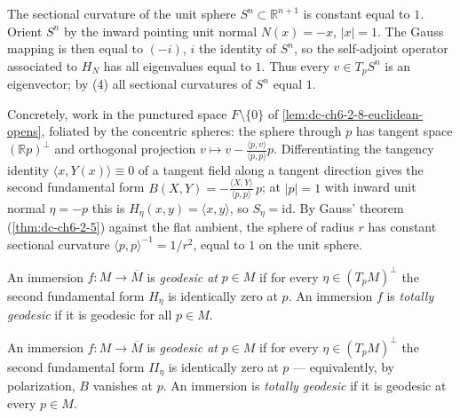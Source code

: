 \begin{example}[curvature of $S^n$]
  \label{ex:dc-ch6-2-8}
  \leanok
  \sketch
  The sectional curvature of the unit sphere $S^n\subset\mathbb{R}^{n+1}$ is constant
  equal to $1$. Orient $S^n$ by the inward pointing unit normal $N(x)=-x$,
  $|x|=1$. The Gauss mapping is then equal to $(-i)$, $i$ the identity of $S^n$, so
  the self-adjoint operator associated to $H_N$ has all eigenvalues equal to $1$.
  Thus every $v\in T_pS^n$ is an eigenvector; by (4) all sectional curvatures of
  $S^n$ equal $1$.

  Concretely, work in the punctured space $F\setminus\{0\}$ of
  \cref{lem:dc-ch6-2-8-euclidean-opens}, foliated by the concentric spheres:
  the sphere through $p$ has tangent space $(\mathbb{R}p)^\perp$ and
  orthogonal projection $v\mapsto v-\frac{\langle p,v\rangle}{\langle
  p,p\rangle}p$. Differentiating the tangency identity $\langle x,
  Y(x)\rangle\equiv0$ of a tangent field along a tangent direction gives the
  second fundamental form $B(X,Y)=-\frac{\langle X,Y\rangle}{\langle
  p,p\rangle}\,p$; at $|p|=1$ with inward unit normal $\eta=-p$ this is
  $H_\eta(x,y)=\langle x,y\rangle$, so $S_\eta=\mathrm{id}$. By Gauss'
  theorem (\cref{thm:dc-ch6-2-5}) against the flat ambient, the sphere of
  radius $r$ has constant sectional curvature $\langle
  p,p\rangle^{-1}=1/r^2$, equal to $1$ on the unit sphere.
  
  An immersion $f:M\to\overline{M}$ is \emph{geodesic at} $p\in M$ if for every
  $\eta\in(T_pM)^\perp$ the second fundamental form $H_\eta$ is identically zero at
  $p$. An immersion $f$ is \emph{totally geodesic} if it is geodesic for all $p\in M$.
\end{example}

\begin{definition}
  \label{def:dc-ch6-2-8-geodesic}
  \leanok
  An immersion $f:M\to\overline{M}$ is \emph{geodesic at} $p\in M$ if for every
  $\eta\in(T_pM)^\perp$ the second fundamental form $\mathit{II}_\eta$ is
  identically zero at $p$ — equivalently, by polarization, $B$ vanishes at $p$.
  An immersion is \emph{totally geodesic} if it is geodesic at every
  $p\in M$.
\end{definition}

